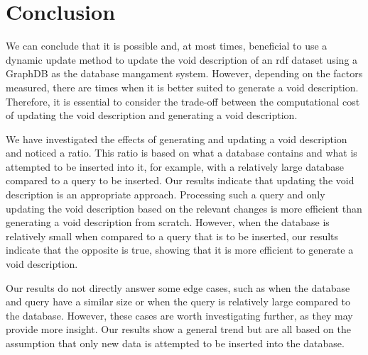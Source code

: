 \section{Conclusion}\label{sec:conclusion}
We can conclude that it is possible and, at most times, beneficial to use a dynamic update method to update the \gls{void} description of an \gls{rdf} dataset using a GraphDB as the database mangament system. However, depending on the factors measured, there are times when it is better suited to generate a \gls{void} description. Therefore, it is essential to consider the trade-off between the computational cost of updating the \gls{void} description and generating a \gls{void} description.


We have investigated the effects of generating and updating a \gls{void} description and noticed a ratio. This ratio is based on what a database contains and what is attempted to be inserted into it, for example, with a relatively large database compared to a query to be inserted. Our results indicate that updating the \gls{void} description is an appropriate approach. Processing such a query and only updating the \gls{void} description based on the relevant changes is more efficient than generating a \gls{void} description from scratch. However, when the database is relatively small when compared to a query that is to be inserted, our results indicate that the opposite is true, showing that it is more efficient to generate a \gls{void} description.

Our results do not directly answer some edge cases, such as when the database and query have a similar size or when the query is relatively large compared to the database. However, these cases are worth investigating further, as they may provide more insight. Our results show a general trend but are all based on the assumption that only new data is attempted to be inserted into the database.


